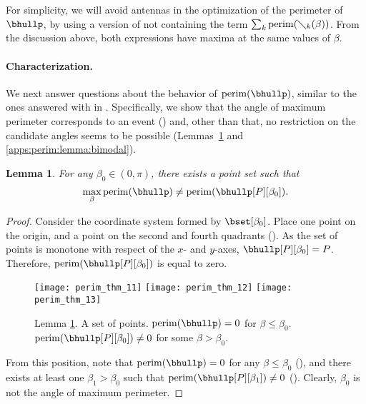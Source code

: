 \documentclass[11pt,letterpaper,english]{article}
\newtheorem{lemma}{Lemma}
\theoremstyle{definition}
\newcommand{\perim}{\operatorname{perim}}
\begin{document}
 For simplicity, we will avoid antennas in the optimization of the
 perimeter of $\bhullp$, by using a version of
  not containing the term
 $\sum_k \perim(\diagdown_k(\beta))$. From the discussion above, both
 expressions have maxima at the same values of $\beta$.

\paragraph{Characterization.}

We next answer questions about the behavior of $\perim(\bhullp)$,
similar to the ones answered with
 in
. Specifically, we show that the angle of
maximum perimeter corresponds to an event
() and, other than that, no restriction
on the candidate angles seems to be possible
(Lemmas~\ref{apps:perim:lemma:max_angle} and \ref{apps:perim:lemma:bimodal}).

\begin{lemma}\label{apps:perim:lemma:max_angle}
  For any $\beta_0 \in (0,\pi)$, there exists a point set such that
  \[\max_{\beta} \perim(\bhullp)\neq\perim(\bhullp[P][\beta_0]).\]
\end{lemma}

\begin{proof}
  Consider the coordinate system formed by $\bset[\beta_0]$. Place one
  point on the origin, and a point on the second and fourth
  quadrants (). As the set of points
  is monotone with respect of the $x$- and $y$-axes,
  $\bhullp[P][\beta_0] = P$. Therefore, $\perim(\bhullp[P][\beta_0])$
  is equal to zero.

  \begin{figure}[ht]
    \centering \subcaptionbox{\label{apps:perim:fig:max_angle:1}}
    {\texttt{[image: perim\_thm\_11]}}
    \hspace{1cm}
    \subcaptionbox{\label{apps:perim:fig:max_angle:2}}
    {\texttt{[image: perim\_thm\_12]}}
    \hspace{1cm}
    \subcaptionbox{\label{apps:perim:fig:max_angle:3}}
    {\texttt{[image: perim\_thm\_13]}}
    \caption{Lemma
      \ref{apps:perim:lemma:max_angle}. 
      A set of points. 
      $\perim(\bhullp) = 0$ for $\beta \leq \beta_0$.
      $\perim(\bhullp[P][\beta_0]) \neq 0$ for some
      $\beta > \beta_0$.}
    \label{apps:perim:fig:max_angle}
  \end{figure}

  From this position, note that $\perim(\bhullp) = 0$ for any
  $\beta \leq \beta_0$ (), and there
  exists at least one $\beta_1 > \beta_0$ such that
  $\perim(\bhullp[P][\beta_1]) \neq 0$
  (). Clearly, $\beta_0$ is not the
  angle of maximum perimeter.
\end{proof}
\end{document}

